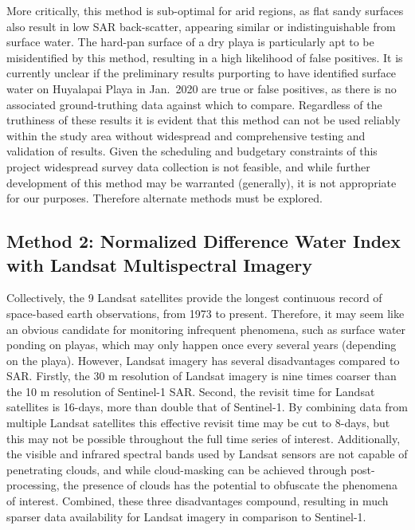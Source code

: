 \documentclass[
]{agujournal2019}
\begin{document}
More critically, this method is sub-optimal for arid regions, as flat
sandy surfaces also result in low SAR back-scatter, appearing similar or
indistinguishable from surface water. The hard-pan surface of a dry
playa is particularly apt to be misidentified by this method, resulting
in a high likelihood of false positives. It is currently unclear if the
preliminary results purporting to have identified surface water on
Huyalapai Playa in Jan.~2020 are true or false positives, as there is no
associated ground-truthing data against which to compare. Regardless of
the truthiness of these results it is evident that this method can not
be used reliably within the study area without widespread and
comprehensive testing and validation of results. Given the scheduling
and budgetary constraints of this project widespread survey data
collection is not feasible, and while further development of this method
may be warranted (generally), it is not appropriate for our purposes.
Therefore alternate methods must be explored.

\subsection{Method 2: Normalized Difference Water Index with Landsat
Multispectral
Imagery}\label{method-2-normalized-difference-water-index-with-landsat-multispectral-imagery}

Collectively, the 9 Landsat satellites provide the longest continuous
record of space-based earth observations, from 1973 to present.
Therefore, it may seem like an obvious candidate for monitoring
infrequent phenomena, such as surface water ponding on playas, which may
only happen once every several years (depending on the playa). However,
Landsat imagery has several disadvantages compared to SAR. Firstly, the
30 m resolution of Landsat imagery is nine times coarser than the 10 m
resolution of Sentinel-1 SAR. Second, the revisit time for Landsat
satellites is 16-days, more than double that of Sentinel-1. By combining
data from multiple Landsat satellites this effective revisit time may be
cut to 8-days, but this may not be possible throughout the full time
series of interest. Additionally, the visible and infrared spectral
bands used by Landsat sensors are not capable of penetrating clouds, and
while cloud-masking can be achieved through post-processing, the
presence of clouds has the potential to obfuscate the phenomena of
interest. Combined, these three disadvantages compound, resulting in
much sparser data availability for Landsat imagery in comparison to
Sentinel-1.
\end{document}
